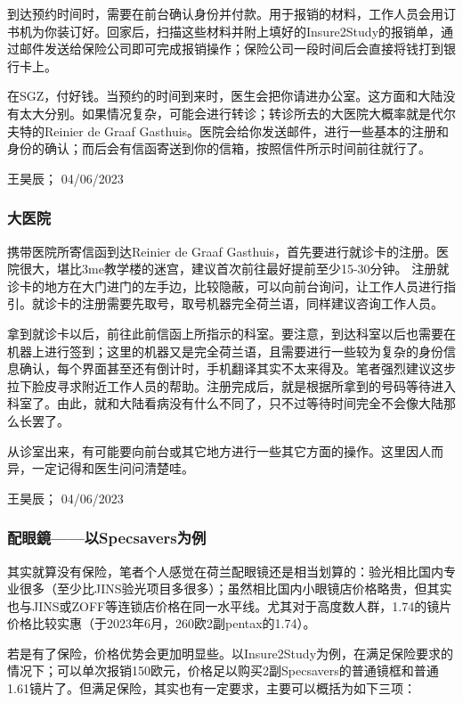 到达预约时间时，需要在前台确认身份并付款。用于报销的材料，工作人员会用订书机为你装订好。回家后，扫描这些材料并附上填好的Insure2Study的报销单，通过邮件发送给保险公司即可完成报销操作；保险公司一段时间后会直接将钱打到银行卡上。

在SGZ，付好钱。当预约的时间到来时，医生会把你请进办公室。这方面和大陆没有太大分别。如果情况复杂，可能会进行转诊；转诊所去的大医院大概率就是代尔夫特的Reinier de Graaf Gasthuis。医院会给你发送邮件，进行一些基本的注册和身份的确认；而后会有信函寄送到你的信箱，按照信件所示时间前往就行了。
\begin{flushright}
王昊辰； 04/06/2023
\end{flushright}

\subsubsection{大医院}
携带医院所寄信函到达Reinier de Graaf Gasthuis，首先要进行就诊卡的注册。医院很大，堪比3me教学楼的迷宫，建议首次前往最好提前至少15-30分钟。 注册就诊卡的地方在大门进门的左手边，比较隐蔽，可以向前台询问，让工作人员进行指引。就诊卡的注册需要先取号，取号机器完全荷兰语，同样建议咨询工作人员。

拿到就诊卡以后，前往此前信函上所指示的科室。要注意，到达科室以后也需要在机器上进行签到；这里的机器又是完全荷兰语，且需要进行一些较为复杂的身份信息确认，每个界面甚至还有倒计时，手机翻译其实不太来得及。笔者强烈建议这步拉下脸皮寻求附近工作人员的帮助。注册完成后，就是根据所拿到的号码等待进入科室了。由此，就和大陆看病没有什么不同了，只不过等待时间完全不会像大陆那么长罢了。

从诊室出来，有可能要向前台或其它地方进行一些其它方面的操作。这里因人而异，一定记得和医生问问清楚哇。
\begin{flushright}
王昊辰； 04/06/2023
\end{flushright}

\subsubsection{配眼鏡——以Specsavers为例}
其实就算没有保险，笔者个人感觉在荷兰配眼镜还是相当划算的：验光相比国内专业很多（至少比JINS验光项目多很多）；虽然相比国内小眼镜店价格略贵，但其实也与JINS或ZOFF等连锁店价格在同一水平线。尤其对于高度数人群，1.74的镜片价格比较实惠（于2023年6月，260欧2副pentax的1.74）。

若是有了保险，价格优势会更加明显些。以Insure2Study为例，在满足保险要求的情况下；可以单次报销150欧元，价格足以购买2副Specsavers的普通镜框和普通1.61镜片了。但满足保险，其实也有一定要求，主要可以概括为如下三项：

